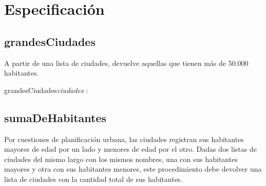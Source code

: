 \documentclass[10pt,a4paper]{article}
\begin{document}

\maketitle

\section{Especificación}

\subsection{grandesCiudades}

A partir de una lista de ciudades, devuelve aquellas que tienen más de 50.000 habitantes.

\vspace{2mm}  %

\begin{proc}{grandesCiudades}{\In \textit{ciudades} : }{}
\end{proc}

\vspace{2mm}





\vspace{2mm}

{}

\vspace{4mm}

\subsection{sumaDeHabitantes}

Por cuestiones de planificación urbana, las ciudades registran sus habitantes mayores de edad por un lado y menores de edad por el otro. Dadas dos listas de ciudades del mismo largo con los mismos nombres, una con sus habitantes mayores y otra con sus habitantes menores, este procedimiento debe devolver una lista de ciudades con la cantidad total de sus habitantes.
\end{document}
